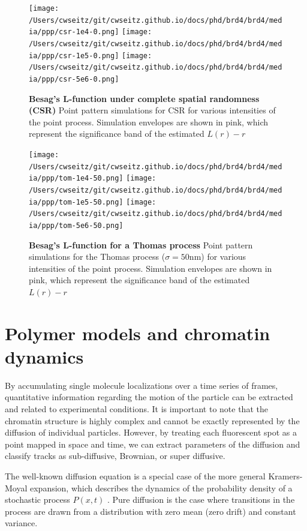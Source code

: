 \begin{figure}
\centering
\texttt{[image: /Users/cwseitz/git/cwseitz.github.io/docs/phd/brd4/brd4/media/ppp/csr-1e4-0.png]}
\texttt{[image: /Users/cwseitz/git/cwseitz.github.io/docs/phd/brd4/brd4/media/ppp/csr-1e5-0.png]}
\texttt{[image: /Users/cwseitz/git/cwseitz.github.io/docs/phd/brd4/brd4/media/ppp/csr-5e6-0.png]}
\caption{\textbf{Besag's L-function under complete spatial randomness (CSR)} Point pattern simulations for CSR for various intensities of the point process. Simulation envelopes are shown in pink, which represent the significance band of the estimated $L(r)-r$}
\label{fig:fig17}
\end{figure}

\begin{figure}
\centering
\texttt{[image: /Users/cwseitz/git/cwseitz.github.io/docs/phd/brd4/brd4/media/ppp/tom-1e4-50.png]}
\texttt{[image: /Users/cwseitz/git/cwseitz.github.io/docs/phd/brd4/brd4/media/ppp/tom-1e5-50.png]}
\texttt{[image: /Users/cwseitz/git/cwseitz.github.io/docs/phd/brd4/brd4/media/ppp/tom-5e6-50.png]}
\caption{\textbf{Besag's L-function for a Thomas process} Point pattern simulations for the Thomas process ($\sigma=50\mathrm{nm}$) for various intensities of the point process. Simulation envelopes are shown in pink, which represent the significance band of the estimated $L(r)-r$}
\label{fig:fig18}
\end{figure}
\clearpage


\section{Polymer models and chromatin dynamics}

By accumulating single molecule localizations over a time series of frames, quantitative information regarding the motion of the particle can be extracted and related to experimental conditions. It is important to note that the chromatin structure is highly complex and cannot be exactly represented by the diffusion of individual particles. However, by treating each fluorescent spot as a point mapped in space and time, we can extract parameters of the diffusion and classify tracks as sub-diffusive, Brownian, or super diffusive. 

The well-known diffusion equation is a special case of the more general Kramers-Moyal expansion, which describes the dynamics of the probability density of a stochastic process $P(x,t)$ \parencite{Gardiner2009}. Pure diffusion is the case where transitions in the process are drawn from a distribution with zero mean (zero drift) and constant variance. 

